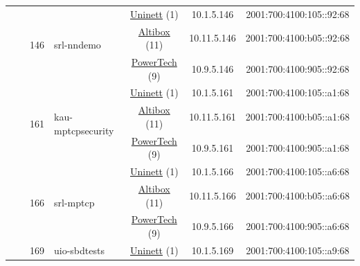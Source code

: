 \begin{small}
\begin{center}
\begin{longtable}{|c|c|c|c|c|c|c|c|}
  &  & \multirow{3}{*}{\tiny{146}} & \multicolumn{1}{|l|}{\multirow{3}{*}{\tiny{srl-nndemo}}} & \multicolumn{2}{|c|}{\tiny{\href{https://www.uninett.no}{Uninett} (1)}} & \tiny{10.1.5.146} & \tiny{2001:700:4100:105::92:68} \\* \cline{5-5}\cline{6-6}\cline{7-7}\cline{8-8}
  &  &  &  & \multicolumn{2}{|c|}{\tiny{\href{https://www.altibox.no}{Altibox} (11)}} & \tiny{10.11.5.146} & \tiny{2001:700:4100:b05::92:68} \\* \cline{5-5}\cline{6-6}\cline{7-7}\cline{8-8}
  &  &  &  & \multicolumn{2}{|c|}{\tiny{\href{http://www.powertech.no}{PowerTech} (9)}} & \tiny{10.9.5.146} & \tiny{2001:700:4100:905::92:68} \\* \cline{3-3}\cline{4-4}\cline{5-5}\cline{6-6}\cline{7-7}\cline{8-8}
  &  & \multirow{3}{*}{\tiny{161}} & \multicolumn{1}{|l|}{\multirow{3}{*}{\tiny{kau-mptcpsecurity}}} & \multicolumn{2}{|c|}{\tiny{\href{https://www.uninett.no}{Uninett} (1)}} & \tiny{10.1.5.161} & \tiny{2001:700:4100:105::a1:68} \\* \cline{5-5}\cline{6-6}\cline{7-7}\cline{8-8}
  &  &  &  & \multicolumn{2}{|c|}{\tiny{\href{https://www.altibox.no}{Altibox} (11)}} & \tiny{10.11.5.161} & \tiny{2001:700:4100:b05::a1:68} \\* \cline{5-5}\cline{6-6}\cline{7-7}\cline{8-8}
  &  &  &  & \multicolumn{2}{|c|}{\tiny{\href{http://www.powertech.no}{PowerTech} (9)}} & \tiny{10.9.5.161} & \tiny{2001:700:4100:905::a1:68} \\* \cline{3-3}\cline{4-4}\cline{5-5}\cline{6-6}\cline{7-7}\cline{8-8}
  &  & \multirow{3}{*}{\tiny{166}} & \multicolumn{1}{|l|}{\multirow{3}{*}{\tiny{srl-mptcp}}} & \multicolumn{2}{|c|}{\tiny{\href{https://www.uninett.no}{Uninett} (1)}} & \tiny{10.1.5.166} & \tiny{2001:700:4100:105::a6:68} \\* \cline{5-5}\cline{6-6}\cline{7-7}\cline{8-8}
  &  &  &  & \multicolumn{2}{|c|}{\tiny{\href{https://www.altibox.no}{Altibox} (11)}} & \tiny{10.11.5.166} & \tiny{2001:700:4100:b05::a6:68} \\* \cline{5-5}\cline{6-6}\cline{7-7}\cline{8-8}
  &  &  &  & \multicolumn{2}{|c|}{\tiny{\href{http://www.powertech.no}{PowerTech} (9)}} & \tiny{10.9.5.166} & \tiny{2001:700:4100:905::a6:68} \\* \cline{3-3}\cline{4-4}\cline{5-5}\cline{6-6}\cline{7-7}\cline{8-8}
  &  & \multirow{3}{*}{\tiny{169}} & \multicolumn{1}{|l|}{\multirow{3}{*}{\tiny{uio-sbdtests}}} & \multicolumn{2}{|c|}{\tiny{\href{https://www.uninett.no}{Uninett} (1)}} & \tiny{10.1.5.169} & \tiny{2001:700:4100:105::a9:68} \\* \cline{5-5}\cline{6-6}\cline{7-7}\cline{8-8}

\end{longtable}
\end{center}
\end{small}
